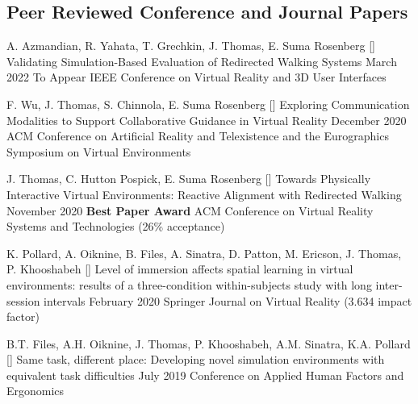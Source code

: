 

\begin{cventries}

       
  
  \vspace{-.75cm}
  \subsection*{Peer Reviewed Conference and Journal Papers}
  \cventry
    {A. Azmandian, R. Yahata, T. Grechkin, J. Thomas, E. Suma Rosenberg} %
    {[\thenpubs] Validating Simulation-Based Evaluation of Redirected Walking Systems} %
    {March 2022} %
    {To Appear} %
    {IEEE Conference on Virtual Reality and 3D User Interfaces}%
    
  \cventry
    {F. Wu, J. Thomas, S. Chinnola, E. Suma Rosenberg} %
    {[\thenpubs] Exploring Communication Modalities to Support Collaborative Guidance in Virtual Reality} %
    {December 2020} %
    {} %
    {ACM Conference on Artificial Reality and Telexistence and the Eurographics Symposium on Virtual Environments}%
    
  \cventry
    {J. Thomas, C. Hutton Pospick, E. Suma Rosenberg} %
    {[\thenpubs] Towards Physically Interactive Virtual Environments: Reactive Alignment with Redirected Walking} %
    {November 2020} %
    {\textbf{Best Paper Award}} %
    {ACM Conference on Virtual Reality Systems and Technologies (26\% acceptance)}%
    
  \cventry
    {K. Pollard, A. Oiknine, B. Files, A. Sinatra, D. Patton, M. Ericson, J. Thomas, P. Khooshabeh}
    {[\thenpubs] Level of immersion affects spatial learning in virtual environments: results of a three-condition within-subjects study with long inter-session intervals}
    {February 2020}
    {}
    {Springer Journal on Virtual Reality (3.634 impact factor)}
    
  \cventry
    {B.T. Files, A.H. Oiknine, J. Thomas, P. Khooshabeh, A.M. Sinatra, K.A. Pollard} %
    {[\thenpubs] Same task, different place: Developing novel simulation environments with equivalent task difficulties} %
    {July 2019} %
    {} %
    {Conference on Applied Human Factors and Ergonomics} %


\end{cventries}
